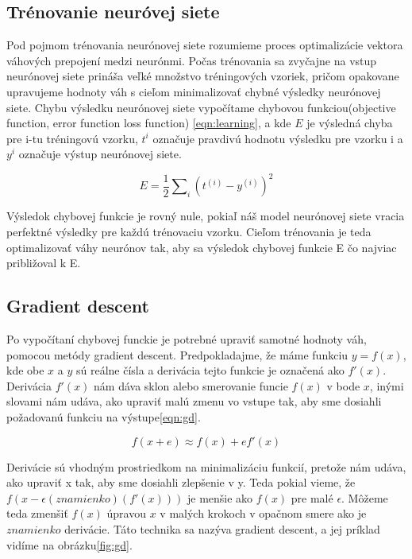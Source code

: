 \subsection{Trénovanie neuróvej siete}
Pod pojmom trénovania neurónovej siete rozumieme proces optimalizácie vektora váhových prepojení medzi neurónmi.
Počas trénovania sa zvyčajne na vstup neurónovej siete prináša veľké množstvo tréningových vzoriek, pričom opakovane upravujeme hodnoty váh s cieľom minimalizovať chybné výsledky neurónovej siete.
Chybu výsledku neurónovej siete vypočítame chybovou funkciou(objective function, error function loss function) \eqref{eqn:learning}, a kde $E$ je výsledná chyba pre i-tu tréningovú vzorku, $t^{i}$ označuje pravdivú hodnotu výsledku pre vzorku i a $y^{i}$ označuje výstup neurónovej siete.

\begin{equation}\label{eqn:learning}
E = \frac{1}{2} \sum \nolimits_{i} (t^{(i)} - y^{(i)})^2
\end{equation}

Výsledok chybovej funkcie je rovný nule, pokiaľ náš model neurónovej siete vracia perfektné výsledky pre každú trénovaciu vzorku.
Cieľom trénovania je teda optimalizovať váhy neurónov tak, aby sa výsledok chybovej funkcie E čo najviac približoval k E. 

\subsection{Gradient descent}\label{gd}
Po vypočítaní chybovej funckie je potrebné upraviť samotné hodnoty váh, pomocou metódy gradient descent.
Predpokladajme, že máme funkciu $y = f(x)$, kde obe $x$ a $y$ sú reálne čísla a derivácia tejto funkcie je označená
ako $f'(x)$.
Derivácia $f'(x)$ nám dáva sklon alebo smerovanie funcie $f(x)$ v bode $x$, inými slovami nám udáva, ako upraviť
malú zmenu vo vstupe tak, aby sme dosiahli požadovanú funkciu na výstupe\eqref{eqn:gd}. \cite{goodfellow2016deep}

\begin{equation}\label{eqn:gd}
f(x + e) \approx f(x) + ef'(x)
\end{equation}

\indent Derivácie sú vhodným prostriedkom na minimalizáciu funkcií, pretože nám udáva, ako upraviť x tak, aby sme dosiahli zlepšenie v y. 
Teda pokial vieme, že $f(x -  \epsilon (znamienko) (f'(x)))$ je menšie ako $f(x)$ pre malé $\epsilon$.
Môžeme teda zmenšiť $f(x)$ úpravou $x$ v malých krokoch v opačnom smere ako je $znamienko$ derivácie.
Táto technika sa nazýva gradient descent, a jej príklad vidíme na obrázku\ref{fig:gd}. \cite{goodfellow2016deep} \\

